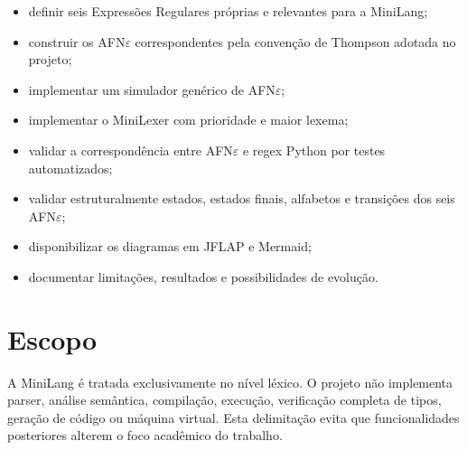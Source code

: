 \begin{itemize}
    \item definir seis Expressões Regulares próprias e relevantes para a MiniLang;
    \item construir os AFN$\varepsilon$ correspondentes pela convenção de Thompson adotada no projeto;
    \item implementar um simulador genérico de AFN$\varepsilon$;
    \item implementar o MiniLexer com prioridade e maior lexema;
    \item validar a correspondência entre AFN$\varepsilon$ e regex Python por testes automatizados;
    \item validar estruturalmente estados, estados finais, alfabetos e transições dos seis AFN$\varepsilon$;
    \item disponibilizar os diagramas em JFLAP e Mermaid;
    \item documentar limitações, resultados e possibilidades de evolução.
\end{itemize}

\section{Escopo}

A MiniLang é tratada exclusivamente no nível léxico. O projeto não implementa parser, análise semântica, compilação, execução, verificação completa de tipos, geração de código ou máquina virtual. Esta delimitação evita que funcionalidades posteriores alterem o foco acadêmico do trabalho.
